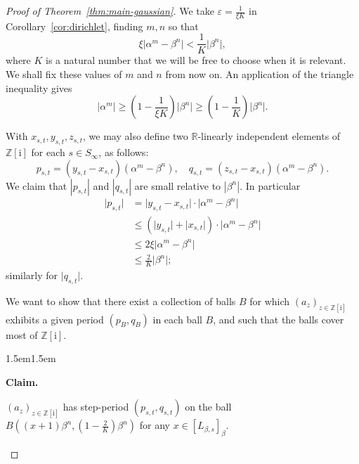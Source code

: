 \documentclass{amsart}
\newcommand{\Z}{\mathbb{Z}}
\newcommand{\R}{\mathbb{R}}
\newcommand{\ii}{\mathrm{i}}
\def\claimmargin{1.5em}
\newenvironment{claim}{\list{} {\rightmargin\claimmargin \leftmargin\claimmargin} \item[] \textbf{Claim.}\hspace{0.5em}\begin{itshape}}{\end{itshape}\endlist}
\newenvironment{claimproof}{\list{} {\rightmargin\claimmargin \leftmargin\claimmargin} \item[]\textit{Proof.}\hspace{1em}}{\hfill $\diamond$\endlist}
\newtheorem*{main theorem}{Theorem \ref{thm:main-gaussian}}
\theoremstyle{definition}
\begin{document}
\begin{proof}[Proof of Theorem~\ref{thm:main-gaussian}]
We  take $\varepsilon=\frac{1}{\xi K}$ in Corollary~\ref{cor:dirichlet}, finding $m,n$ so that
\begin{equation}\label{eq:close-powers-xi-K-version}
    \xi \lvert \alpha^m-\beta^n\rvert<\frac{1}{K}\lvert \beta^n\rvert,
\end{equation} 
where $K$ is a natural number that we will be free to choose when it is relevant. We shall fix these values of $m$ and $n$ from now on. An application of the triangle inequality gives
\begin{equation}\label{eq:alpha-wins-over-beta}
    \lvert\alpha^m\rvert\ge\left(1-\frac{1}{\xi K}\right)\lvert\beta^n\rvert\ge\left(1-\frac{1}{K}\right)\lvert\beta^n\rvert.
\end{equation}







With $x_{s,t},y_{s,t},z_{s,t}$, we may also define two $\R$-linearly independent elements of $\Z[\ii]$ for each $s\in S_\infty$, as follows:
\begin{equation}\label{eq:period-definition}
    p_{s,t}=(y_{s,t}-x_{s,t})(\alpha^m-\beta^n),\quad q_{s,t}=(z_{s,t}-x_{s,t})(\alpha^m-\beta^n).
\end{equation}
We claim that $|p_{s,t}|$ and $|q_{s,t}|$ are small relative to $|\beta^n|$. In particular
\begin{align*}
    \lvert p_{s,t}\rvert &= \lvert y_{s,t} - x_{s,t}\rvert\cdot\lvert\alpha^m-\beta^n\rvert \\
    &\le (\lvert y_{s,t}\rvert + \lvert x_{s,t}\rvert)\cdot \lvert\alpha^m-\beta^n\rvert \\
    &\le 2\xi \lvert\alpha^m-\beta^n\rvert \\
    &\le \frac{2}{K}\lvert\beta^n\rvert;
\end{align*}
similarly for $\lvert q_{s,t}\rvert$.

We want to show that there exist a collection of balls $B$ for which $(a_z)_{z\in\Z[\ii]}$ exhibits a given period $(p_B,q_B)$ in each ball $B$, and such that the balls cover most of $\Z[\ii]$.

\begin{claim}
    $(a_z)_{z\in\Z[\ii]}$ has step-period $(p_{s,t},q_{s,t})$ on the ball $B((x+1)\beta^n,(1-\frac{2}{K})\beta^n)$ for any $x\in [L_{\beta, s}]_\beta$.
\end{claim}



\end{proof}
\end{document}

